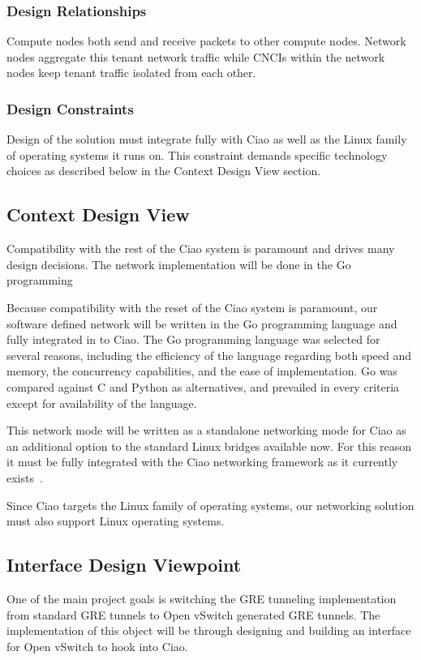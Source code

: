 \documentclass[10pt,onecolumn,journal,draftclsnofoot]{IEEEtran}
\begin{document}
\subsubsection{Design Relationships}

Compute nodes both send and receive packets to other compute nodes. Network
nodes aggregate this tenant network traffic while CNCIs within the network nodes
keep tenant traffic isolated from each other.

\subsubsection{Design Constraints}

Design of the solution must integrate fully with Ciao as well as the Linux
family of operating systems it runs on. This constraint demands specific
technology choices as described below in the Context Design View section.

\subsection{Context Design View}

Compatibility with the rest of the Ciao system is paramount and drives many
design decisions. The network implementation will be done in the Go programming

Because compatibility with the reset of the Ciao system is paramount, our
software defined network will be written in the Go programming language and
fully integrated in to Ciao. The Go programming language was selected for
several reasons, including the efficiency of the language regarding both speed
and memory, the concurrency capabilities, and the ease of implementation. Go was
compared against C and Python as alternatives, and prevailed in every criteria
except for availability of the language.

This network mode will be written as a standalone networking mode for Ciao as an
additional option to the standard Linux bridges available now. For this reason
it must be fully integrated with the Ciao networking framework as it currently
exists~\cite{ciaoNetworking}.

Since Ciao targets the Linux family of operating systems, our networking
solution must also support Linux operating systems.

\subsection{Interface Design Viewpoint}
One of the main project goals is switching the GRE tunneling implementation 
from standard GRE tunnels to Open vSwitch generated GRE tunnels. The
implementation of this object will be through designing and building an
interface for Open vSwitch to hook into Ciao. 
\end{document}
